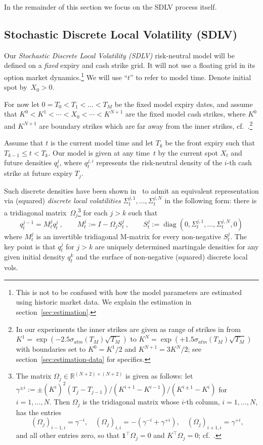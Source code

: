 \documentclass[11pt]{article}
\newcommand{\one}{\mathbf 1}
\theoremstyle{plain}
\theoremstyle{definition}
\theoremstyle{remark}
\begin{document}
In the remainder of this section we focus on the SDLV process itself.

\subsection{Stochastic Discrete Local Volatility (SDLV)}

Our \emph{Stochastic Discrete Local Volatility (SDLV)} risk-neutral model will be defined on a \emph{fixed} expiry and cash strike grid. It will not use a floating grid in its option market dynamics.\footnote{This is not to be confused with 
how the model parameters are estimated using historic market data. We explain the estimation in section~\ref{sec:estimation}.} We will use ``$t$'' to refer to 
model time. Denote initial spot by~$X_0>0$.

For now let $0=T_0<T_1<\dots<T_M$ be the fixed model expiry dates, and assume that $K^0<K^1<\cdots<X_0<\cdots<K^{N+1}$ are the fixed model cash strikes, where 
$K^0$ and $K^{N+1}$
are boundary strikes which are far away from the inner strikes, cf.~\cite{SANOS2026}.\footnote{In our experiments the inner strikes are given as range of strikes
in from $K^1=\exp(-2.5 \sigma_{atm}(T_M) \sqrt{T_M})$ to $K^N=\exp(+1.5 \sigma_{atm}(T_M) \sqrt{T_M})$ with boundaries set to $K^0=K^1/2$ and $K^{N+1}=3 K^N / 2$; see
section~\ref{sec:estimation-data} for specifics.
}

Assume that $t$ is the current model time and let $T_k$ be the front expiry such that $T_{k-1}\leq t<T_k$.
Our model is given at any time~$t$
by the current spot $X_t$ and future densities $q_t^j$, where $q_t^{j,i}$ represents the risk-neutral density of the $i$-th cash strike at future expiry $T_j$.

Such discrete densities have been shown in~\cite{BuehlerRyskin2016} to admit an equivalent representation via (squared) \emph{discrete local volatilities} $\Sigma_t^{j,1},\ldots,\Sigma_t^{j,N}$ in the following form:
there is a tridiagonal matrix~$\Omega_j$\footnote{
  The matrix $\Omega_j\in\mathbb R^{(N+2)\times(N+2)}$ is given as follows: 
  let $\gamma^{\pm i} := \pm (K^{i})^2 (T_j-T_{j-1}) / (K^{i+1}-K^{i-1}) / (K^{i\pm 1} - K^i) $ for $i=1,\ldots,N$.
  Then $\Omega_j$ is the tridiagonal matrix whose $i$-th column, $i=1,\ldots,N$, has the entries
  \[
    (\Omega_j)_{i-1,i} = \gamma^{-i},\quad
    (\Omega_j)_{i,i} = -(\gamma^{-i}+\gamma^{+i}),\quad
    (\Omega_j)_{i+1,i} = \gamma^{+i},
  \]
  and all other entries zero, so that $\one^{\!\top}\Omega_j=0$ and $K^{\!\top}\Omega_j=0$;
  cf.~\cite{SANOS2026}.
 } for each $j>k$ such that
    \begin{equation}
      q_t^{j-1}=M_t^jq_t^j \ ,
      \qquad
      M_t^j:=I-\Omega_jS_t^j \ ,
      \qquad
      S_t^j:=\operatorname{diag}(0,\Sigma_t^{j,1},\ldots,
        \Sigma_t^{j,N},0) 
      \label{eq:hb_dlv}
    \end{equation}
where $M^j_t$ is an invertible tridiagonal M-matrix for every non-negative $S_t^j$. The key point is that $q_t^j$ for $j>k$ are uniquely determined martingale densities
for any given initial density $q_t^k$ and the surface of non-negative (squared) discrete local vols.
\end{document}
